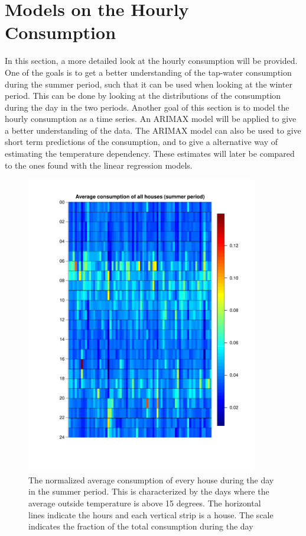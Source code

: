 \chapter{Models on the Hourly Consumption}
In this section, a more detailed look at the hourly consumption will be provided. One of the goals is to get a better understanding of the tap-water consumption during the summer period, such that it can be used when looking at the winter period. This can be done by looking at the distributions of the consumption during the day in the two periods. Another goal of this section is to model the hourly consumption as a time series. An ARIMAX model will be applied to give a better understanding of the data. The ARIMAX model can also be used to give short term predictions of the consumption, and to give a alternative way of estimating the temperature dependency. These estimates will later be compared to the ones found with the linear regression models.


\begin{figure}
    \centering
    \includegraphics[width=0.9\textwidth]{../../../figures/Heatmap_summer.pdf}
    \caption{The normalized average consumption of every house during the day in the summer period. This is characterized by the days where the average outside temperature is above 15 degrees. The horizontal lines indicate the hours and each vertical strip is a house. The scale indicates the fraction of the total consumption during the day}
    \label{fig: Hourcons_summer}
\end{figure}


